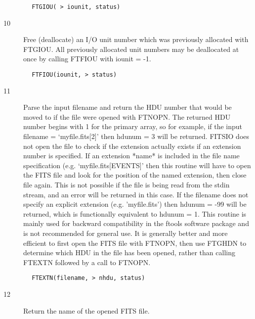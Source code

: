 \documentclass[11pt]{book}
\begin{document}
\begin{verbatim}
        FTGIOU( > iounit, status)
\end{verbatim}

\begin{description}
\item[10]  Free (deallocate) an I/O unit number which was previously allocated
    with FTGIOU.   All previously allocated unit numbers may be
   deallocated at once by calling FTFIOU with iounit = -1.
\end{description}

\begin{verbatim}
        FTFIOU(iounit, > status)
\end{verbatim}

\begin{description}
\item[11]  Parse the input filename and return the HDU number that would be
moved to if the file were opened with FTNOPN.    The returned HDU
number begins with 1 for the primary array, so for example, if the
input filename = `myfile.fits[2]' then hdunum = 3 will be returned.
FITSIO does not open the file to check if the extension actually exists
if an extension number is specified. If an extension *name* is included
in the file name specification (e.g.  `myfile.fits[EVENTS]' then this
routine will have to open the FITS file and look for the position of
the named extension, then close file again.  This is not possible if
the file is being read from the stdin stream, and an error will be
returned in this case.  If the filename does not specify an explicit
extension (e.g. 'myfile.fits') then hdunum = -99 will be returned,
which is functionally equivalent to hdunum = 1. This routine is mainly
used for backward compatibility in the ftools software package and is
not recommended for general use.  It is generally better and more
efficient to first open the FITS file with FTNOPN, then use FTGHDN to
determine which HDU in the file has been opened, rather than calling
 FTEXTN followed by a call to FTNOPN.
\end{description}

\begin{verbatim}
        FTEXTN(filename, > nhdu, status)
\end{verbatim}

\begin{description}
\item[12] Return the name of the opened FITS file.
\end{description}
\end{document}
